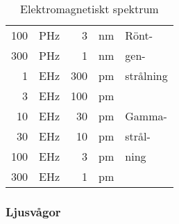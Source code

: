 \begin{table}
\begin{center}
\begin{tabular}{|rl|rl|l|}
100 & PHz &   3 & nm & Rönt-\\
300 & PHz &   1 & nm & gen-\\
  1 & EHz & 300 & pm & strålning\\ \cline{5-5}
  3 & EHz & 100 & pm & \\
 10 & EHz &  30 & pm & Gamma-\\
 30 & EHz &  10 & pm & strål-\\
100 & EHz &   3 & pm & ning\\
300 & EHz &   1 & pm & \\
\hline
\end{tabular}
\end{center}
\caption{Elektromagnetiskt spektrum}
\label{tab:elektromagnetiskt_spektrum}
\end{table}

\subsubsection{Ljusvågor}

